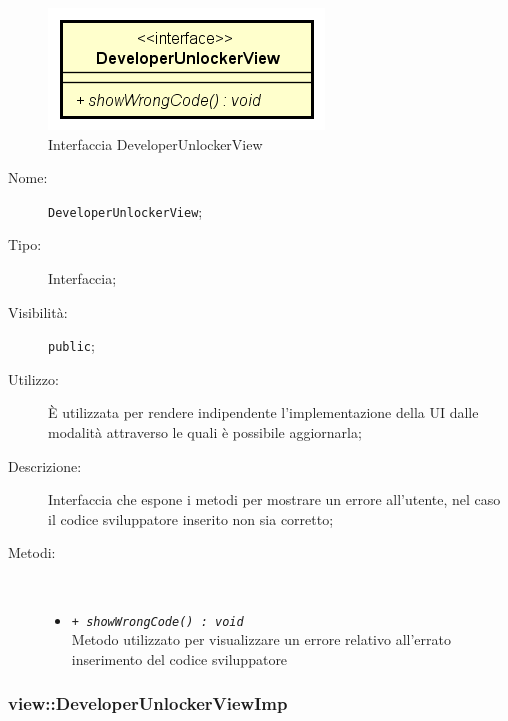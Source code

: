 \documentclass[../DefinizioneDiProdotto.tex]{subfiles}
\begin{document}
    \begin{figure}[H]
        \centering
        \includegraphics{img/DeveloperUnlockerView.png}
        \caption{Interfaccia DeveloperUnlockerView}\label{fig:view::DeveloperUnlockerView} 
    \end{figure}
    \begin{description}
\item[Nome:] \texttt{DeveloperUnlockerView};
\item[Tipo:] Interfaccia;
\item[Visibilità:] \texttt{public};
\item[Utilizzo:] È utilizzata per rendere indipendente l'implementazione della UI dalle modalità attraverso le quali è possibile aggiornarla;
\item[Descrizione:] Interfaccia che espone i metodi per mostrare un errore all'utente, nel caso il codice sviluppatore inserito non sia corretto;
\item[Metodi:] \
\begin{itemize}
\item \texttt{+ \textit{showWrongCode() : void}}\\
Metodo utilizzato per visualizzare un errore relativo all'errato inserimento del codice sviluppatore
 \end{itemize}
\end{description}

\subsubsection{view::DeveloperUnlockerViewImp}
\end{document}
